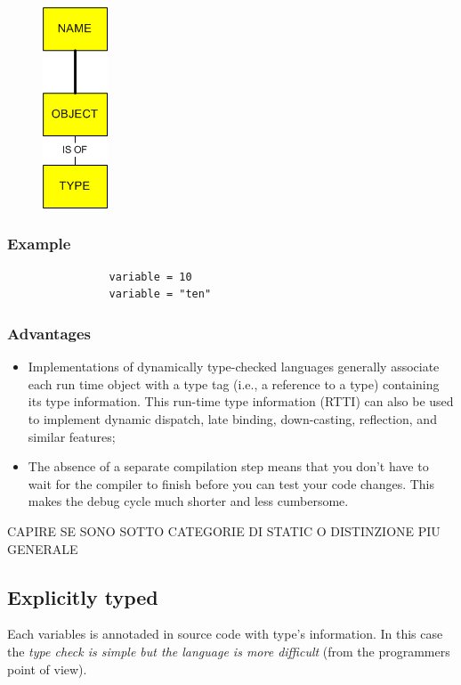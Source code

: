 \documentclass[12pt]{article}
\begin{document}
		\begin{figure}[h!]
			\centering
			\includegraphics[scale=0.60]{img/dynamic.png}
		\end{figure}
	
		\subsubsection{Example}
			\begin{lstlisting}
				variable = 10
				variable = "ten"
			\end{lstlisting}
		
		\subsubsection{Advantages}
			\begin{itemize}
				\item Implementations of dynamically type-checked languages generally associate each run time object with a type tag (i.e., a reference to a type) containing its type information. This run-time type information (RTTI) can also be used to implement dynamic dispatch, late binding, down-casting, reflection, and similar features;
				\item The absence of a separate compilation step means that you don’t have to wait for the compiler to finish before you can test your code changes. This makes the debug cycle much shorter and less cumbersome.
			\end{itemize}
			
		CAPIRE SE SONO SOTTO CATEGORIE DI STATIC O DISTINZIONE PIU GENERALE 
	\subsection{Explicitly typed}
		Each variables is annotaded in source code with type's information. In this case the \textit{type check is simple but the language is more difficult} (from the programmers point of view).
			
\end{document}
